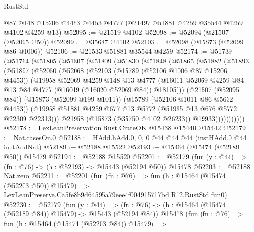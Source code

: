 \begin{lexlean}{RustStd}
\begin{coremodule}
    @87
    @148
    @15206
    @4453
    @4453
    @4777
    (@21497 @51881 @4259 @35544 @4259 @4102 @4259 @13)
@52095 := @21519 @4102
@52098 := @52094 (@21507 (@52095 @50))
@52099 := @35687 @4102
@52103 := @52098 (@15873 (@52099 @86 @1006))
@52106 := @21533 @51881 @35544 @4259
@52174 := @51739
    (@51764
      (@51805
        (@51807
          (@51809
            (@51830
              (@51848
                (@51865
                  (@51882
                    (@51893
                      (@51897
                        (@52050
                          (@52068
                            (@52103
                              (@15789 (@52106 @1006 @87 @15206 @4453))
                              (@19958
                                @52069
                                @4259
                                @148
                                @13
                                @4777
                                (@16011
                                  @52069
                                  @4259
                                  @84
                                  @13
                                  @84
                                  @4777
                                  (@16019 (@16020 @52069 @84))
                                  @18105)))
                            (@21507 (@52095 @84))
                            (@15873 (@52099 @199 @1011))
                            (@15789 (@52106 @1011 @86 @5632 @4453))
                            (@19958
                              @51881
                              @4259
                              @677
                              @13
                              @5772
                              (@51985 @13 @676 @5772 @22309 @22313)))
                          @21958
                          (@15873 (@35750 @4102 @26233))
                          @19933)))))))))))
@52178 := LexLeanPreservation.Rust.CrateOK @15438 @15440 @15442
@52179 := Nat.casesOn.{0}
@52188 := HAdd.hAdd.{0, 0, 0} @44 @44 @44 (instHAdd.{0} @44 instAddNat)
@52189 := @52188 @15522
@52193 := @15464 (@15474 (@52189 @50)) @15479
@52194 := @52188 @15520
@52201 := @52179 (fun (y : @44) => (fn : @76) -> (h : @52193) -> @15443 (@52194 @50)) @15478
@52203 := @52188 Nat.zero
@52211 := @52201
    (fun (fn : @76) =>
    fun (h : @15464 (@15474 (@52203 @50)) @15479) =>
    LexLeanPreserve.Ca5fe8b9d64595a79eee4f004915717bd.R12.RustStd.fun0)
@52230 := @52179
    (fun (y : @44) =>
    (fn : @76) -> (h : @15464 (@15474 (@52189 @84)) @15479) -> @15443 (@52194 @84))
    @15478
    (fun (fn : @76) =>
    fun (h : @15464 (@15474 (@52203 @84)) @15479) =>

\end{coremodule}
\end{lexlean}
